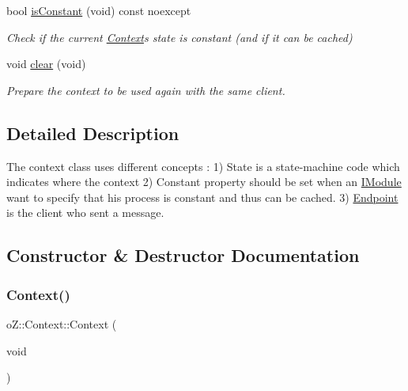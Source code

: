 \begin{DoxyCompactItemize}
bool \mbox{\hyperlink{classo_z_1_1_context_a748147258019436983fdbbf6ed51c0b6}{is\+Constant}} (void) const noexcept
\begin{DoxyCompactList}\small\item\em Check if the current \mbox{\hyperlink{classo_z_1_1_context}{Context}}\textquotesingle{}s state is constant (and if it can be cached) \end{DoxyCompactList}\item 
void \mbox{\hyperlink{classo_z_1_1_context_ade0f49a6468ea81eec1e97ace81b926e}{clear}} (void)
\begin{DoxyCompactList}\small\item\em Prepare the context to be used again with the same client. \end{DoxyCompactList}\end{DoxyCompactItemize}


\subsection{Detailed Description}
The context class uses different concepts \+: 1) State is a state-\/machine code which indicates where the context 2) Constant property should be set when an \mbox{\hyperlink{classo_z_1_1_i_module}{I\+Module}} want to specify that his process is constant and thus can be cached. 3) \mbox{\hyperlink{classo_z_1_1_endpoint}{Endpoint}} is the client who sent a message. 

\subsection{Constructor \& Destructor Documentation}
\mbox{\label{classo_z_1_1_context_af3aab1b32d4333320612049bdafb07d7}} 
\subsubsection{\texorpdfstring{Context()}{Context()}\hspace{0.1cm}{\footnotesize\ttfamily [1/4]}}
{\footnotesize\ttfamily o\+Z\+::\+Context\+::\+Context (\begin{DoxyParamCaption}\item[{void}]{ }\end{DoxyParamCaption})\hspace{0.3cm}{\ttfamily [default]}}




